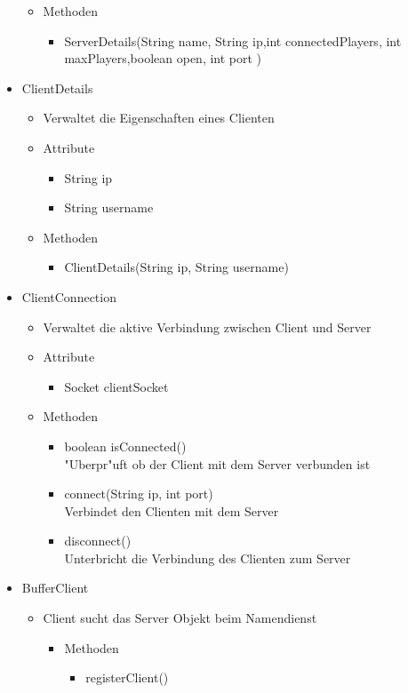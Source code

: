 \documentclass[a4paper,10pt]{article}
\begin{document}
\begin{itemize}
\begin {itemize}
\begin{itemize}
\item int port
\end{itemize}
\item Methoden
\begin{itemize}
\item ServerDetails(String name, String ip,int connectedPlayers, int maxPlayers,boolean open, int port ) 
\end{itemize}
\end{itemize}
\item ClientDetails
\begin{itemize}
\item Verwaltet die Eigenschaften eines Clienten
\end{itemize}
\begin {itemize}
\item Attribute
\begin{itemize}
\item String ip
\item String username
\end{itemize}
\item Methoden
\begin{itemize}
\item ClientDetails(String ip, String username) 
\end{itemize}
\end{itemize}
\item ClientConnection
\begin{itemize}
\item Verwaltet die aktive Verbindung zwischen Client und Server
\end{itemize}
\begin {itemize}
\item Attribute
\begin{itemize}
\item Socket clientSocket
\end{itemize}
\item Methoden
\begin{itemize}
\item boolean isConnected()
\\"Uberpr"uft ob der Client mit dem Server verbunden ist
\item connect(String ip, int port)
\\Verbindet den Clienten mit dem Server
\item disconnect() 
\\Unterbricht die Verbindung des Clienten zum Server
\end{itemize}
\end{itemize}
\item BufferClient
\begin{itemize}
\item Client sucht das Server Objekt beim Namendienst 
\begin {itemize}
\item Methoden
\begin{itemize}
\item registerClient() 
\end{itemize}
\end{itemize}
\end{itemize}
\end{itemize}
\end{document}
